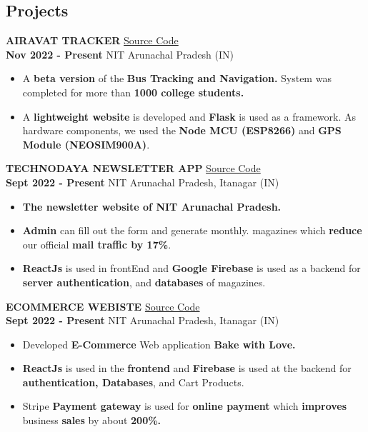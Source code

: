 \documentclass[]{article}
\newenvironment{tightemize}{
\vspace{-\topsep}\begin{itemize}\itemsep1pt \parskip1pt \parsep0pt}
{\end{itemize}\vspace{-\topsep}}
\newcommand{\upper}[1]{
  \MakeUppercase{#1}
}
\newcommand{\projname}[2]{
  {\large{#1}
  \hfill \small{#2}} 
}
\newcommand{\loc}[2]{
  {\small{#1} 
  \hfill \small{#2}}
}
\begin{document}
\begin{multicols}{2}
\begin{flushleft}
    \section*{Projects}
    \projname{\textbf{\upper{{Airavat tracker}}}}{\href{https://github.com/tripathics/airavat}{Source Code}} \\
    \loc{{\textbf{Nov 2022 - Present}}}{NIT Arunachal Pradesh (IN)}
    \begin{tightemize}
      \item  A \textbf{beta version} of the \textbf{Bus Tracking and Navigation.}
      System was completed for more than \textbf{1000 college
      students.}
      \item A \textbf{lightweight website} is developed and \textbf{Flask} is used as a framework. As hardware components, we used the \textbf{Node MCU (ESP8266)} and \textbf {GPS Module (NEOSIM900A)}.
    \end{tightemize}


    \projname{\textbf{\upper{{Technodaya Newsletter App}}}}{\href{https://technodaya.netlify.app/}{Source Code}} \\
    \loc{{\textbf{Sept 2022 - Present}}}{NIT Arunachal Pradesh, Itanagar (IN)}
    \begin{tightemize}
      \item   \textbf{The newsletter website of NIT Arunachal Pradesh.}
      \item   \textbf{Admin} can fill out the form and generate monthly.
      magazines which \textbf{reduce} our official \textbf{mail traffic by 17\%}.
      \item   \textbf{ReactJs} is used in frontEnd and \textbf{ Google Firebase} is used as a
      backend for \textbf{server authentication}, and \textbf{databases} of magazines.
    \end{tightemize}

    \projname{\textbf{\upper{{Ecommerce Webiste}}}}{\href{https://pursottam6003bakewithlove.netlify.app/}{Source Code}} \\
    \loc{{\textbf{Sept 2022 - Present}}}{NIT Arunachal Pradesh, Itanagar (IN)}
    \begin{tightemize}
      \item  Developed \textbf{E-Commerce} Web application \textbf{Bake with Love.}
      \item  \textbf{ReactJs} is used in the \textbf{frontend} and \textbf{Firebase} is used at
      the backend for \textbf{ authentication, Databases}, and Cart
      Products.
      \item  Stripe \textbf{Payment gateway} is used for \textbf{online payment} which
      \textbf{improves} business \textbf{sales} by about \textbf{200\%.}
    \end{tightemize}



\end{flushleft}
\end{multicols}
\end{document}
